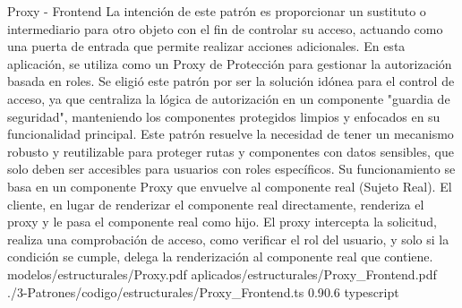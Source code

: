 
\Patron
    {Proxy - Frontend}
    {La intención de este patrón es proporcionar un sustituto o intermediario para otro objeto con el fin de controlar su acceso, actuando como una puerta de entrada que permite realizar acciones adicionales. En esta aplicación, se utiliza como un Proxy de Protección para gestionar la autorización basada en roles. Se eligió este patrón por ser la solución idónea para el control de acceso, ya que centraliza la lógica de autorización en un componente "guardia de seguridad", manteniendo los componentes protegidos limpios y enfocados en su funcionalidad principal.}
    {Este patrón resuelve la necesidad de tener un mecanismo robusto y reutilizable para proteger rutas y componentes con datos sensibles, que solo deben ser accesibles para usuarios con roles específicos. Su funcionamiento se basa en un componente Proxy que envuelve al componente real (Sujeto Real). El cliente, en lugar de renderizar el componente real directamente, renderiza el proxy y le pasa el componente real como hijo. El proxy intercepta la solicitud, realiza una comprobación de acceso, como verificar el rol del usuario, y solo si la condición se cumple, delega la renderización al componente real que contiene.}
    {modelos/estructurales/Proxy.pdf}
    {aplicados/estructurales/Proxy_Frontend.pdf}
    {./3-Patrones/codigo/estructurales/Proxy_Frontend.ts}
    {0.9}{0.6}
    {typescript}
\newpage
